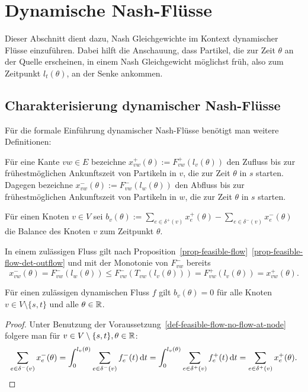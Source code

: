 \chapter{Dynamische Nash-Flüsse}\label{chapter-nash-flows}

Dieser Abschnitt dient dazu, Nash Gleichgewichte im Kontext dynamischer Flüsse einzuführen.
Dabei hilft die Anschauung, dass Partikel, die zur Zeit $\theta$ an der Quelle erscheinen, in einem Nash Gleichgewicht möglichst früh, also zum Zeitpunkt $l_t(\theta)$, an der Senke ankommen.

\section{Charakterisierung dynamischer Nash-Flüsse}


Für die formale Einführung dynamischer Nash-Flüsse benötigt man weitere Definitionen: 

\begin{definition}
	Für eine Kante $vw\in E$ bezeichne $x_{vw}^+(\theta):= F_{vw}^+(l_v(\theta))$ den Zufluss bis zur frühestmöglichen Ankunftszeit von Partikeln in $v$, die zur Zeit $\theta$ in $s$ starten.\\
	Dagegen bezeichne $x_{vw}^-(\theta):= F^-_{vw}(l_w(\theta))$ den Abfluss bis zur frühestmöglichen Ankunftszeit von Partikeln in $w$, die zur Zeit $\theta$ in $s$ starten.
	
	Für einen Knoten $v\in V$ sei $b_v(\theta):=\sum_{e\in\delta^+(v)} x_e^+(\theta) - \sum_{e\in\delta^-(v)} x_e^-(\theta)$ die Balance des Knoten $v$ zum Zeitpunkt $\theta$.
\end{definition}

\begin{remark}\label{remark-x^-leqx^+}
	In einem zulässigen Fluss gilt nach Proposition~\ref{prop-feasible-flow}~\ref{prop-feasible-flow-det-outflow} und mit der Monotonie von $F_{vw}^-$ bereits 
	\[
	x_{vw}^-(\theta) = F_{vw}^-(l_w(\theta)) \leq F_{vw}^-(T_{vw}(l_v(\theta)))=F_{vw}^+(l_v(\theta)) = x_{vw}^+(\theta).
	\]
\end{remark}

\begin{lemma}\label{lemma-balance-0}
	Für einen zulässigen dynamischen Fluss $f$ gilt $b_v(\theta)=0$ für alle Knoten $v\in V\setminus\{ s,t \}$ und alle $\theta\in\mathbb{R}$.
\end{lemma}
\begin{proof}
	Unter Benutzung der Voraussetzung~\ref{def-feasible-flow-no-flow-at-node} folgere man für $v\in V\setminus \{ s, t\}, \theta\in\mathbb{R}$:
	\[ \sum_{e\in\delta^-(v)} x_e^-(\theta) = \int_{0}^{l_v(\theta)} \sum_{e\in\delta^-(v)} f_e^-(t) \mathop{}\!\mathrm{d} t = \int_{0}^{l_v(\theta)} \sum_{e\in\delta^+(v)} f_e^+(t) \mathop{}\!\mathrm{d} t = \sum_{e\in\delta^+(v)}x_e^+(\theta). \]
\end{proof}

